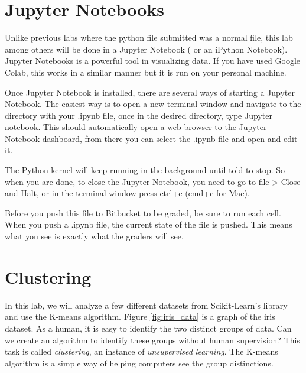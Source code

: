 \section*{Jupyter Notebooks}
Unlike previous labs where the python file submitted was a normal  file, this lab among others will be done in a Jupyter Notebook ( or an iPython Notebook). 
Jupyter Notebooks is a powerful tool in visualizing data.
If you have used Google Colab, this works in a similar manner but it is run on your personal machine. 

Once Jupyter Notebook is installed, there are several ways of starting a Jupyter Notebook. 
The easiest way is to open a new terminal window and navigate to the directory with your .ipynb file, once in the desired directory, type Jupyter notebook.
This should automatically open a web browser to the Jupyter Notebook dashboard, from there you can select the .ipynb file and open and edit it.

The Python kernel will keep running in the background until told to stop.
So when you are done, to close the Jupyter Notebook, you need to go to file-> Close and Halt, or in the terminal window press ctrl+c (cmd+c for Mac). 

\begin{warn}
Before you push this file to Bitbucket to be graded, be sure to run each cell. 
When you push a .ipynb file, the current state of the file is pushed.
This means what you see is exactly what the graders will see.
\end{warn}


\section*{Clustering}

In this lab, we will analyze a few different datasets from Scikit-Learn's library and use the K-means algorithm. 
Figure \ref{fig:iris_data} is a graph of the iris dataset.
As a human, it is easy to identify the two distinct groups of data.
Can we create an algorithm to identify these groups without human supervision?
This task is called \emph{clustering}, an instance of \emph{unsupervised learning}.
The K-means algorithm is a simple way of helping computers see the group distinctions.

